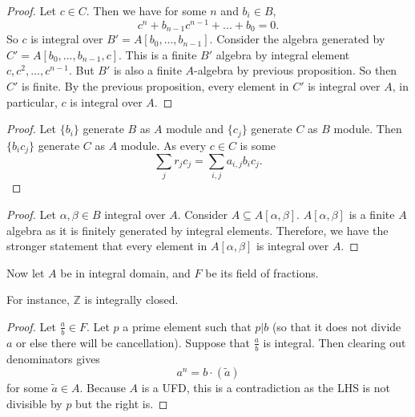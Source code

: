 \begin{proof}
    Let $c\in C$. Then we have for some $n$ and $b_i\in B$, \[
    c^n + b_{n-1}c^{n-1}+...+b_0 =0 .
    \]
    So $c$ is integral over $B'=A[b_0,...,b_{n-1}]$. Consider the algebra generated by $C'=A[b_0,...,b_{n-1},c]$. This is a finite $B'$ algebra by integral element $c, c^2,...,c^{n-1}$. But $B'$ is also a finite $A$-algebra by previous proposition. So then $C'$ is finite. By the previous proposition, every element in $C'$ is integral over $A$, in particular, $c$ is integral over $A$. 
\end{proof}
\begin{proof}
    Let $\{b_i\}$ generate $B$ as $A$ module and $\{c_j\}$ generate $C$ as $B$ module. Then $\{b_ic_j\}$ generate $C$ as $A$ 
    module. As every $c\in C$ is some \[
    \sum_j r_j c_j = \sum_{i,j} a_{i,j}b_ic_j.
    \]
\end{proof}

\begin{proof}
    Let $\alpha,\beta\in B$ integral over $A$. Consider $A\subseteq A[\alpha,\beta]$. $A[\alpha,\beta]$ is a finite $A$ algebra as it is finitely generated by integral elements. Therefore, we have the stronger statement that every element in $A[\alpha,\beta]$ is integral over $A$.
\end{proof}
Now let $A$ be in integral domain, and $F$ be its field of fractions.
\begin{remark}
    For instance, $\mathbb{Z}$ is integrally closed. 
\end{remark}

\begin{proof}
    Let $\frac{a}{b}\in F$. Let $p$ a prime element such that $p|b$ (so that it does not divide $a$ or else there will be cancellation).
    Suppose that $\frac{a}{b}$ is integral. Then clearing out denominators gives \[
    a^n = b\cdot (\tilde{a})
    \] for some $\tilde{a}\in A$. Because $A$ is a UFD, this is a contradiction as the LHS is not divisible by $p$ but the right is.
\end{proof}

